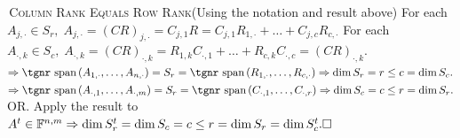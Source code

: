 \documentclass[a4paper, 11pt, UTF8]{article}
\def\Spn{{\textup{\tgnr span}}\,}
\def\Fbb{{\mathbb{F}}}
\def\BulletPoint{{\small\bullet}}
\def\Or{{\large O{\footnotesize R.} }}
\begin{document}
\begin{large}
\BulletPoint \,\hspace{1pt}\textsc{Column Rank Equals Row Rank}\quad (Using the notation and result above)\TextB{}
For each $A_{j,\cdot}\in S_r,\;A_{j,\cdot}=(CR)_{j,\cdot}=C_{j,1}R=C_{j,1}R_{1,\cdot}+\dots+C_{j,c}R_{c,\cdot}$\TextB{}
For each $A_{\cdot,k}\in S_c,\;A_{\cdot,k}=(CR)_{\cdot,k}=R_{1,k}C_{\cdot,1}+\dots+R_{c,k}C_{\cdot,c}=(CR)_{\cdot,k}.$\TextB{}
$\Rightarrow\Spn(A_{1,\cdot},\dots,A_{n,\cdot})=S_r=\Spn(R_{1,\cdot},\dots,R_{c,\cdot})\Rightarrow\dim S_r=r\leq c=\dim S_c.$\TextB{}
$\Rightarrow\Spn(A_{\cdot,1},\dots,A_{\cdot,m})=S_r=\Spn(C_{\cdot,1},\dots,C_{\cdot,r})\Rightarrow\dim S_c=c\leq r=\dim S_r.$\TextB{}
\Or Apply the result to $A^t\in\Fbb^{n,m}\Rightarrow\dim S_r^t=\dim S_c=c\leq r=\dim S_r=\dim S_c^t.\hfill\square$\par
\SepLine\par



\end{large}
\end{document}

